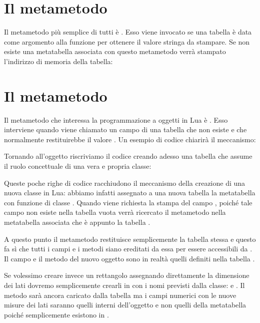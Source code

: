 \section{Il metametodo }

Il metametodo più semplice di tutti è .
Esso viene invocato se una tabella è data come argomento alla funzione
 per ottenere il valore stringa da stampare. Se non
esiste una metatabella associata con questo metametodo verrà stampato
l'indirizzo di memoria della tabella:


\section{Il metametodo }
\label{secFondMetaIndex}

Il metametodo che interessa la programmazione a oggetti in Lua è
. Esso interviene quando viene chiamato un
campo di una tabella che non esiste e che normalmente restituirebbe il valore
. Un esempio di codice chiarirà il meccanismo:

Tornando all'oggetto  riscriviamo il codice creando adesso una
tabella che assume il ruolo concettuale di una vera e propria classe:

Queste poche righe di codice racchiudono il meccanismo della creazione di una
nuova classe in Lua: abbiamo infatti assegnato a una nuova tabella  la
metatabella con funzione di classe . Quando viene richiesta la
stampa del campo , poiché tale campo non esiste nella tabella vuota
 verrà ricercato il metametodo  nella metatabella
associata che è appunto la tabella .

A questo punto il metametodo restituisce semplicemente la tabella
 stessa e questo fa sì che tutti i campi e i metodi siano
ereditati da essa per essere accessibili da . Il campo  e il
metodo  del nuovo oggetto  sono in realtà quelli definiti nella
tabella .

Se volessimo creare invece un rettangolo assegnando direttamente la dimensione
dei lati dovremo semplicemente crearli in  con i nomi previsti dalla
classe:  e . Il metodo  sarà ancora caricato dalla
tabella  ma i campi numerici con le nuove misure dei lati
saranno quelli interni dell'oggetto  e non quelli della metatabella
poiché semplicemente esistono in .

